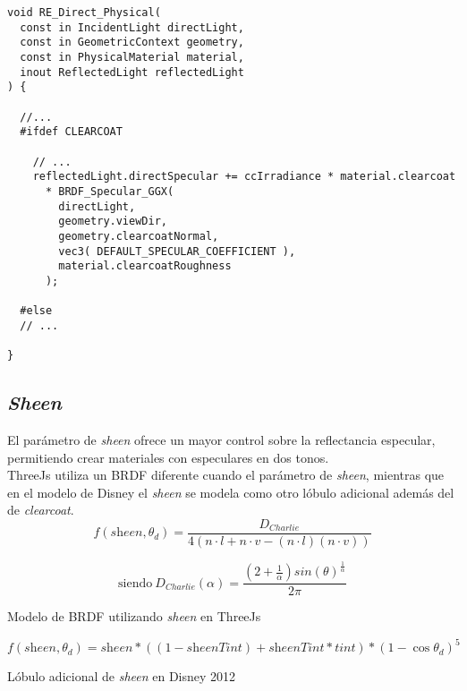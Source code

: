  \begin{lstlisting}[caption={Implementaci\'on del l\'obulo de \textit{clearcoat} en ThreeJs}]
void RE_Direct_Physical(
  const in IncidentLight directLight,
  const in GeometricContext geometry,
  const in PhysicalMaterial material,
  inout ReflectedLight reflectedLight
) {

  //...
  #ifdef CLEARCOAT

    // ...
    reflectedLight.directSpecular += ccIrradiance * material.clearcoat
      * BRDF_Specular_GGX(
        directLight,
        geometry.viewDir,
        geometry.clearcoatNormal,
        vec3( DEFAULT_SPECULAR_COEFFICIENT ),
        material.clearcoatRoughness
      );

  #else
  // ...

}
  \end{lstlisting}
  
  \subsection*{\textit{Sheen}}
  El par\'ametro de \textit{sheen} ofrece un mayor control sobre la reflectancia especular, permitiendo crear materiales con
  especulares en dos tonos.\\

  ThreeJs utiliza un BRDF diferente cuando el par\'ametro de \textit{sheen}, mientras que en el modelo de Disney el \textit{sheen}
  se modela como otro l\'obulo adicional adem\'as del de \textit{clearcoat}.\\

  $$
  f(\textit{sheen}, \theta_d) =\frac{D_{Charlie}}{4(n\cdot{l} + n\cdot{v} - (n\cdot{l})(n\cdot{v}) )}
  $$
  \begin{eqfloat}[!htb]
    \begin{equation}
      \textrm{siendo}\ D_{Charlie}(\alpha) = \frac
      {(2 + \frac{1}{\alpha})sin(\theta)^\frac{1}{\alpha}}
      {2\pi}
    \end{equation}
  \caption{Modelo de BRDF utilizando \textit{sheen} en ThreeJs}
  \end{eqfloat}
  \singlespacing

  \begin{eqfloat}[!htb]
    \begin{equation}
      f(\textit{sheen}, \theta_d) = \textit{sheen} * ((1 - \textit{sheenTint}) + \textit{sheenTint} * \textit{tint}) * (1 - \cos\theta_d)^5
    \end{equation}
  \caption{L\'obulo adicional de \textit{sheen} en Disney 2012}
  \end{eqfloat}
  \singlespacing

